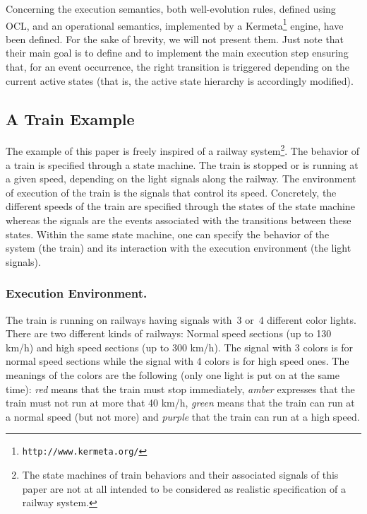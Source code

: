 \documentclass[english, 10pt]{llncs}
\begin{document}
Concerning the execution semantics, both well-evolution rules, defined
using OCL, and an operational semantics, implemented by a
Kermeta\footnote{\texttt{http://www.kermeta.org/}} engine, have been
defined. For the sake of brevity, we will not present them. Just note
that their main goal is to define and to implement the main execution
step ensuring that, for an event occurrence, the right transition is
triggered depending on the current active states (that is, the active
state hierarchy is accordingly modified).

\subsection{A Train Example}

The example of this paper is freely inspired of a railway
system\footnote{The state machines of train behaviors and their
  associated signals of this paper are not at all intended to be
  considered as realistic specification of a railway system.}. The
behavior of a train is specified through a state machine. The train is
stopped or is running at a given speed, depending on the light signals along
the railway. The environment of execution of the train is the signals
that control its speed. Concretely, the different speeds of the
train are specified through the states of the state machine whereas
the signals are the events associated with the transitions between
these states. Within the same state machine, one can specify the
behavior of the system (the train) and its interaction with the
execution environment (the light signals).

\subsubsection{Execution Environment.}

The train is running on railways having signals with~3 or~4 different
color lights. There are two different kinds of railways: Normal speed
sections (up to 130 km/h) and high speed sections (up to 300
km/h). The signal with 3 colors is for normal speed sections while the
signal with 4 colors is for high speed ones. The meanings of the
colors are the following (only one light is put on at the same time):
\textit{red} means that the train must stop immediately,
\textit{amber} expresses that the train must not run at more that 40
km/h, \textit{green} means that the train can run at a normal speed
(but not more) and \textit{purple} that the train can run at a high
speed.
\end{document}
